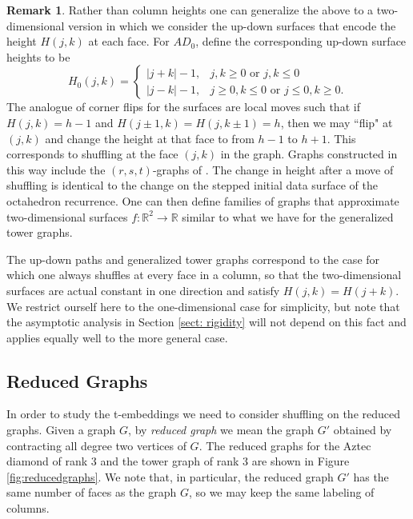\documentclass[12pt]{amsart}
\newcommand{\R}{{\mathbb R}}
\numberwithin{equation}{section}
\theoremstyle{definition}
\newtheorem{remark}[thm]{Remark}
\begin{document}
\begin{remark}\label{rmk:2d}
    Rather than column heights one can generalize the above to a two-dimensional version in which we consider the up-down surfaces  that encode the height $H(j,k)$ at each face. For $AD_0$, define the corresponding up-down surface heights to be 
    \[
    H_0(j,k) = \begin{cases}
        |j+k|-1,& j,k\ge 0 \text{ or } j,k \le 0 \\
        |j-k|-1, & j\ge 0,  k\le 0 \text{ or } j\le 0, k\ge 0.
    \end{cases}
    \]
    The analogue of corner flips for the surfaces are local moves such that if $H(j,k) = h-1$ and $H(j\pm1,k) = H(j,k\pm1) = h$, then we may ``flip" at $(j,k)$ and change the height at that face to from $h-1$ to $h+1$. This corresponds to shuffling at the face $(j,k)$ in the graph. Graphs constructed in this way include the $(r,s,t)$-graphs of \cite{MR4782740}. The change in height after a move of shuffling is identical to the change on the stepped initial data surface of the octahedron recurrence. One can then define families of graphs that approximate two-dimensional surfaces $f:\R^2\to\R$ similar to what we have for the generalized tower graphs. 

    The up-down paths and generalized tower graphs correspond to the case for which one always shuffles at every face in a column, so that the two-dimensional surfaces are actual constant in one direction and satisfy $H(j,k) = H(j+k)$. We restrict ourself here to the one-dimensional case for simplicity, but note that the asymptotic analysis in Section \ref{sect: rigidity} will not depend on this fact and applies equally well to the more general case.
\end{remark}

\subsection{Reduced Graphs}

In order to study the t-embeddings we need to consider shuffling on the reduced graphs. Given a graph $G$, by \emph{reduced graph} we mean the graph $G'$ obtained by contracting all degree two vertices of $G$.  The reduced graphs for the Aztec diamond of rank 3 and the tower graph of rank 3 are shown in Figure \ref{fig:reducedgraphs}.  We note that, in particular, the reduced graph $G'$ has the same number of faces as the graph $G$, so we may keep the same labeling of columns. 
\end{document}

